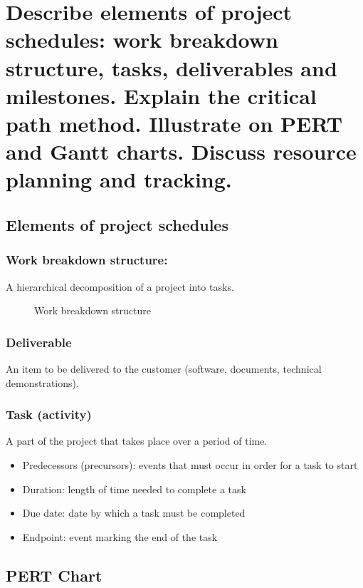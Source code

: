\clearpage{}
\section{Describe elements of project schedules: work breakdown structure,
tasks, deliverables and milestones. Explain the critical path method.
Illustrate on PERT and Gantt charts. Discuss resource planning and
tracking.}

\subsection{Elements of project schedules}

\subsubsection{Work breakdown structure:}
A hierarchical decomposition of a project into tasks.

\begin{figure}[!ht]
    \centering
    
    \caption{Work breakdown structure}
\end{figure}

\subsubsection{Deliverable}
An item to be delivered to the customer (software, documents, technical demonstrations).

\subsubsection{Task (activity)}

A part of the project that takes place over a period of time.

\begin{itemize}
    \item Predecessors (precursors): events that must occur in order for a task to start
    \item Duration: length of time needed to complete a task
    \item Due date: date by which a task must be completed
    \item Endpoint: event marking the end of the task
\end{itemize}

\subsection{PERT Chart}

